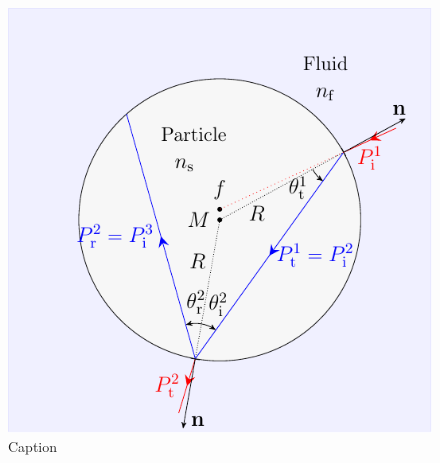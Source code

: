 \lipsum[1-2]

\begin{figure}[htp]
  \centering
  \includegraphics[]{Plots/cache/ray.pdf}
  \caption{Caption}
  \label{fig:Th-ray_particle}
\end{figure}

\lipsum[1-2]

